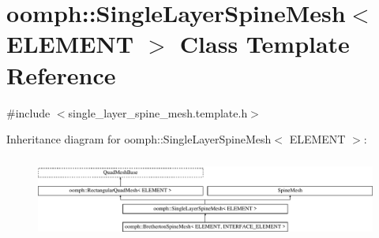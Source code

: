 \hypertarget{classoomph_1_1SingleLayerSpineMesh}{}\section{oomph\+:\+:Single\+Layer\+Spine\+Mesh$<$ E\+L\+E\+M\+E\+NT $>$ Class Template Reference}
\label{classoomph_1_1SingleLayerSpineMesh}


{\ttfamily \#include $<$single\+\_\+layer\+\_\+spine\+\_\+mesh.\+template.\+h$>$}

Inheritance diagram for oomph\+:\+:Single\+Layer\+Spine\+Mesh$<$ E\+L\+E\+M\+E\+NT $>$\+:\begin{figure}[H]
\begin{center}
\leavevmode
\includegraphics[height=2.731707cm]{classoomph_1_1SingleLayerSpineMesh}
\end{center}
\end{figure}
